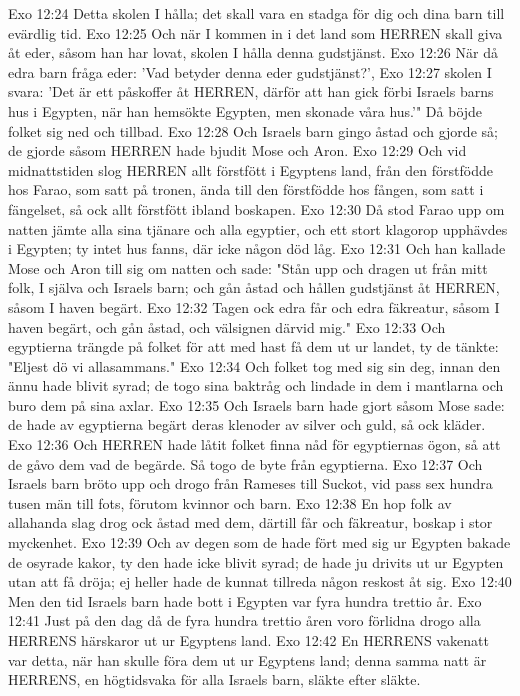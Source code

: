 Exo 12:24  Detta skolen I hålla; det skall vara en stadga för dig och dina barn till evärdlig tid.
Exo 12:25  Och när I kommen in i det land som HERREN skall giva åt eder, såsom han har lovat, skolen I hålla denna gudstjänst.
Exo 12:26  När då edra barn fråga eder: 'Vad betyder denna eder gudstjänst?',
Exo 12:27  skolen I svara: 'Det är ett påskoffer åt HERREN, därför att han gick förbi Israels barns hus i Egypten, när han hemsökte Egypten, men skonade våra hus.'" Då böjde folket sig ned och tillbad.
Exo 12:28  Och Israels barn gingo åstad och gjorde så; de gjorde såsom HERREN hade bjudit Mose och Aron.
Exo 12:29  Och vid midnattstiden slog HERREN allt förstfött i Egyptens land, från den förstfödde hos Farao, som satt på tronen, ända till den förstfödde hos fången, som satt i fängelset, så ock allt förstfött ibland boskapen.
Exo 12:30  Då stod Farao upp om natten jämte alla sina tjänare och alla egyptier, och ett stort klagorop upphävdes i Egypten; ty intet hus fanns, där icke någon död låg.
Exo 12:31  Och han kallade Mose och Aron till sig om natten och sade: "Stån upp och dragen ut från mitt folk, I själva och Israels barn; och gån åstad och hållen gudstjänst åt HERREN, såsom I haven begärt.
Exo 12:32  Tagen ock edra får och edra fäkreatur, såsom I haven begärt, och gån åstad, och välsignen därvid mig."
Exo 12:33  Och egyptierna trängde på folket för att med hast få dem ut ur landet, ty de tänkte: "Eljest dö vi allasammans."
Exo 12:34  Och folket tog med sig sin deg, innan den ännu hade blivit syrad; de togo sina baktråg och lindade in dem i mantlarna och buro dem på sina axlar.
Exo 12:35  Och Israels barn hade gjort såsom Mose sade: de hade av egyptierna begärt deras klenoder av silver och guld, så ock kläder.
Exo 12:36  Och HERREN hade låtit folket finna nåd för egyptiernas ögon, så att de gåvo dem vad de begärde. Så togo de byte från egyptierna.
Exo 12:37  Och Israels barn bröto upp och drogo från Rameses till Suckot, vid pass sex hundra tusen män till fots, förutom kvinnor och barn.
Exo 12:38  En hop folk av allahanda slag drog ock åstad med dem, därtill får och fäkreatur, boskap i stor myckenhet.
Exo 12:39  Och av degen som de hade fört med sig ur Egypten bakade de osyrade kakor, ty den hade icke blivit syrad; de hade ju drivits ut ur Egypten utan att få dröja; ej heller hade de kunnat tillreda någon reskost åt sig.
Exo 12:40  Men den tid Israels barn hade bott i Egypten var fyra hundra trettio år.
Exo 12:41  Just på den dag då de fyra hundra trettio åren voro förlidna drogo alla HERRENS härskaror ut ur Egyptens land.
Exo 12:42  En HERRENS vakenatt var detta, när han skulle föra dem ut ur Egyptens land; denna samma natt är HERRENS, en högtidsvaka för alla Israels barn, släkte efter släkte.
